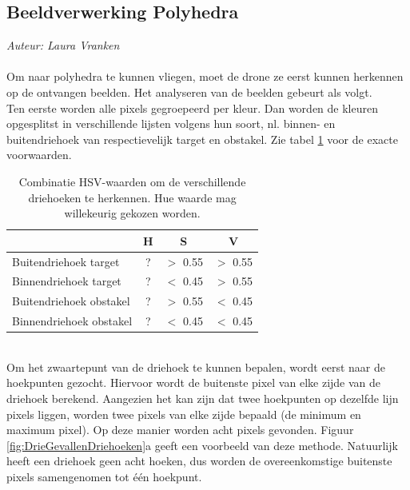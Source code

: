 \subsection{Beeldverwerking Polyhedra}
{\em Auteur: Laura Vranken}
\\
\\
\noindent
Om naar polyhedra te kunnen vliegen, moet de drone ze eerst kunnen herkennen op de ontvangen beelden. Het analyseren van de beelden gebeurt als volgt. 
\\
Ten eerste worden alle pixels gegroepeerd per kleur. Dan worden de kleuren opgesplitst in verschillende lijsten volgens hun soort, nl. binnen- en buitendriehoek van respectievelijk target en obstakel. Zie tabel \ref{table: HSVwaarden} voor de exacte voorwaarden.
\begin{table}[h]
	\centering
\begin{tabular}{ l | c | c | c }
	 & H & S & V\\\hline
	Buitendriehoek target & ? & \(>\) 0.55 & \(>\) 0.55 \\
	Binnendriehoek target & ? & \(<\) 0.45 & \(>\) 0.55 \\
	Buitendriehoek obstakel & ? & \(>\) 0.55 & \(<\) 0.45 \\
	Binnendriehoek obstakel & ? & \(<\) 0.45 & \(<\) 0.45\\
\end{tabular}
\caption{\label{table: HSVwaarden}Combinatie HSV-waarden om de verschillende driehoeken te herkennen. Hue waarde mag willekeurig gekozen worden.}
\end{table}
\\
Om het zwaartepunt van de driehoek te kunnen bepalen, wordt eerst naar de hoekpunten gezocht. Hiervoor wordt de buitenste pixel van elke zijde van de driehoek berekend. Aangezien het kan zijn dat twee hoekpunten op dezelfde lijn pixels liggen, worden twee pixels van elke zijde bepaald (de minimum en maximum pixel). Op deze manier worden acht pixels gevonden. Figuur \ref{fig:DrieGevallenDriehoeken}a geeft een voorbeeld van deze methode. Natuurlijk heeft een driehoek geen acht hoeken, dus worden de overeenkomstige buitenste pixels samengenomen tot één hoekpunt. 
